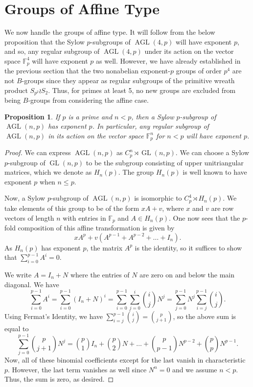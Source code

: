 \documentclass[12pt]{amsart}
\newtheorem{proposition}[theorem]{Proposition}
\theoremstyle{definition}
\newcommand{\F}{\mathbb{F}}
\DeclareMathOperator{\GL}{GL}
\DeclareMathOperator{\AGL}{AGL}
\begin{document}
\section{Groups of Affine Type}
	
We now handle the groups of affine type. It will follow from the below proposition that the Sylow $p$-subgroups of $\AGL(4,p)$ will have exponent $p$, and so, any regular subgroup of $\AGL(4,p)$ under its action on the vector space $\F_p^4$ will have exponent $p$ as well. However, we have already established in the previous section that the two nonabelian exponent-$p$ groups of order $p^4$ are not $B$-groups since they appear as regular subgroups of the primitive wreath product $S_{p^2} \wr S_2$. Thus, for primes at least 5, no new groups are excluded from being $B$-groups from considering the affine case.

\begin{proposition}
	If $p$ is a prime and $n < p$, then a Sylow $p$-subgroup of $\AGL(n,p)$ has exponent $p$. In particular, any regular subgroup of $\AGL(n,p)$ in its action on the vector space $\F_p^n$ for $n < p$ will have exponent $p$. 
\end{proposition}
\begin{proof}
	We can express $\AGL(n,p)$ as $C_p^n \rtimes \GL(n,p)$. We can choose a Sylow $p$-subgroup of $\GL(n,p)$ to be the subgroup consisting of upper unitriangular matrices, which we denote as $H_n(p)$. The group $H_n(p)$ is well known to have exponent $p$ when $n \leq p$.
	
	Now, a Sylow $p$-subgroup of $\AGL(n,p)$ is isomorphic to $C_p^4 \rtimes H_n(p)$. We take elements of this group to be of the form $xA + v$, where $x$ and $v$ are row vectors of length $n$ with entries in $\F_p$ and $A \in H_n(p)$. One now sees that the $p$-fold composition of this affine transformation is given by
	$$
		xA^p + v(A^{p-1} + A^{p-2} + \ldots + I_n).
	$$
	As $H_n(p)$ has exponent $p$, the matrix $A^p$ is the identity, so it suffices to show that $\sum_{i=0}^{p-1} A^i = 0$. 
	
	We write $A = I_n + N$ where the entries of $N$ are zero on and below the main diagonal. We have
	$$
		\sum_{i=0}^{p-1} A^i = \sum_{i=0}^{p-1} (I_n + N)^i = \sum_{i=0}^{p-1} \sum_{j=0}^i \binom{i}{j} N^j = \sum_{j=0}^{p-1} N^j \sum_{i=j}^{p-1} \binom{i}{j}.
	$$ 
	Using Fermat's Identity, we have $\sum_{i=j}^{p-1} \binom{i}{j} = \binom{p}{j+1}$, so the above sum is equal to $$
		\sum_{j=0}^{p-1} \binom{p}{j+1} N^j = \binom{p}{1}I_n + \binom{p}{2}N + \ldots + \binom{p}{p-1}N^{p-2} + \binom{p}{p}N^{p-1}.
	$$
	Now, all of these binomial coefficients except for the last vanish in characteristic $p$. However, the last term vanishes as well since $N^n = 0$ and we assume $n < p$. Thus, the sum is zero, as desired.
\end{proof}
\end{document}
